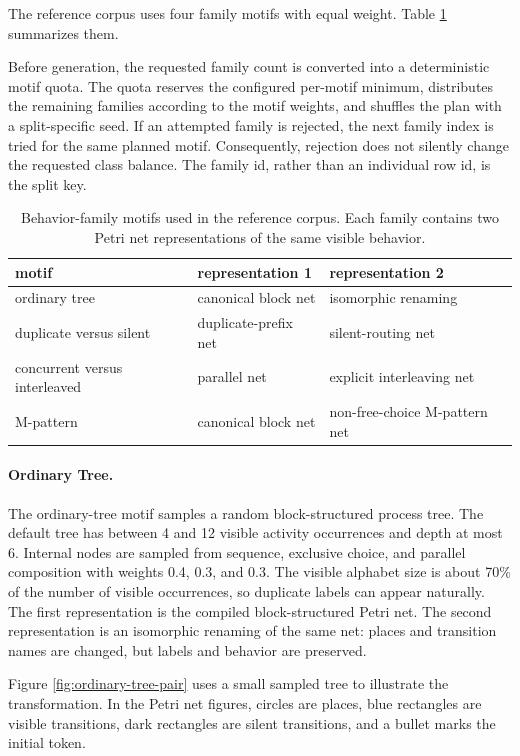 \documentclass[11pt]{article}
\begin{document}
The reference corpus uses four family motifs with equal weight. Table
\ref{tab:appendix-motifs} summarizes them.

Before generation, the requested family count is converted into a deterministic
motif quota. The quota reserves the configured per-motif minimum, distributes
the remaining families according to the motif weights, and shuffles the plan
with a split-specific seed. If an attempted family is rejected, the next family
index is tried for the same planned motif. Consequently, rejection does not
silently change the requested class balance. The family id, rather than an
individual row id, is the split key.

\begin{table}
\centering
\caption{Behavior-family motifs used in the reference corpus. Each family
contains two Petri net representations of the same visible behavior.}
\label{tab:appendix-motifs}
\small
\begin{tabular}{@{}lll@{}}
\toprule
motif & representation 1 & representation 2 \\
\midrule
ordinary tree & canonical block net & isomorphic renaming \\
duplicate versus silent & duplicate-prefix net & silent-routing net \\
concurrent versus interleaved & parallel net & explicit interleaving net \\
M-pattern & canonical block net & non-free-choice M-pattern net \\
\bottomrule
\end{tabular}
\end{table}

\paragraph{Ordinary Tree.}
The ordinary-tree motif samples a random block-structured process tree. The
default tree has between 4 and 12 visible activity occurrences and depth at
most 6. Internal nodes are sampled from sequence, exclusive choice, and
parallel composition with weights 0.4, 0.3, and 0.3. The visible alphabet size
is about 70\% of the number of visible occurrences, so duplicate labels can
appear naturally. The first representation is the compiled block-structured
Petri net. The second representation is an isomorphic renaming of the same net:
places and transition names are changed, but labels and behavior are preserved.

Figure \ref{fig:ordinary-tree-pair} uses a small sampled tree to illustrate the
transformation. In the Petri net figures, circles are places, blue rectangles
are visible transitions, dark rectangles are silent transitions, and a bullet
marks the initial token.
\end{document}
